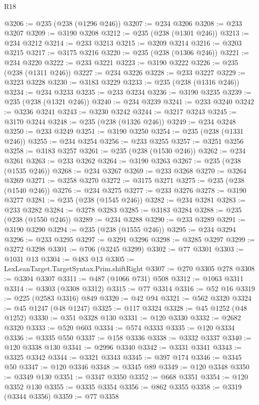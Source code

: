\begin{lexlean}{R18}
\begin{coremodule}
@3206 := @235 (@238 (@1296 @246))
@3207 := @234 @3206
@3208 := @233 @3207
@3209 := @3190 @3208
@3212 := @235 (@238 (@1301 @246))
@3213 := @234 @3212
@3214 := @233 @3213
@3215 := @3209 @3214
@3216 := @3203 @3215
@3217 := @3175 @3216
@3220 := @235 (@238 (@1306 @246))
@3221 := @234 @3220
@3222 := @233 @3221
@3223 := @3190 @3222
@3226 := @235 (@238 (@1311 @246))
@3227 := @234 @3226
@3228 := @233 @3227
@3229 := @3223 @3228
@3230 := @3183 @3229
@3233 := @235 (@238 (@1316 @246))
@3234 := @234 @3233
@3235 := @233 @3234
@3236 := @3190 @3235
@3239 := @235 (@238 (@1321 @246))
@3240 := @234 @3239
@3241 := @233 @3240
@3242 := @3236 @3241
@3243 := @3230 @3242
@3244 := @3217 @3243
@3245 := @3170 @3244
@3248 := @235 (@238 (@1326 @246))
@3249 := @234 @3248
@3250 := @233 @3249
@3251 := @3190 @3250
@3254 := @235 (@238 (@1331 @246))
@3255 := @234 @3254
@3256 := @233 @3255
@3257 := @3251 @3256
@3258 := @3183 @3257
@3261 := @235 (@238 (@1530 @246))
@3262 := @234 @3261
@3263 := @233 @3262
@3264 := @3190 @3263
@3267 := @235 (@238 (@1535 @246))
@3268 := @234 @3267
@3269 := @233 @3268
@3270 := @3264 @3269
@3271 := @3258 @3270
@3272 := @3175 @3271
@3275 := @235 (@238 (@1540 @246))
@3276 := @234 @3275
@3277 := @233 @3276
@3278 := @3190 @3277
@3281 := @235 (@238 (@1545 @246))
@3282 := @234 @3281
@3283 := @233 @3282
@3284 := @3278 @3283
@3285 := @3183 @3284
@3288 := @235 (@238 (@1550 @246))
@3289 := @234 @3288
@3290 := @233 @3289
@3291 := @3190 @3290
@3294 := @235 (@238 (@1555 @246))
@3295 := @234 @3294
@3296 := @233 @3295
@3297 := @3291 @3296
@3298 := @3285 @3297
@3299 := @3272 @3298
@3301 := @706 (@3245 @3299)
@3302 := @77 @3301
@3303 := @1031 @13
@3304 := @483 @13
@3305 := LexLeanTarget.TargetSyntax.Prim.shiftRight
@3307 := @270 @3305 @278
@3308 := @3304 @3307
@3311 := @487 (@1066 @731) @508
@3312 := @1063 @3311
@3314 := @3303 (@3308 @3312)
@3315 := @77 @3314
@3316 := @52 @16
@3319 := @225 (@2583 @3316) @849
@3320 := @42 @94
@3321 := @562 @3320
@3324 := @45 @1247 (@48 @1247)
@3325 := @117 @3324
@3328 := @45 @1252 (@48 @1252)
@3330 := @351 @3328 @130
@3331 := @120 @3330
@3332 := @2682 @3320
@3333 := @520 @603
@3334 := @574 @3333
@3335 := @120 @3334
@3336 := @3335 @550
@3337 := @158 @3336
@3338 := @3332 @3337
@3340 := @120 @3338 @130
@3341 := @2996 @3340
@3342 := @3331 @3341
@3343 := @3325 @3342
@3344 := @3321 @3343
@3345 := @397 @174
@3346 := @3345 @50
@3347 := @120 @3346
@3348 := @3345 @89
@3349 := @120 @3348
@3350 := @3349 @130
@3351 := @3347 @3350
@3352 := @668 @3351
@3354 := @120 @3352 @130
@3355 := @3335 @3354
@3356 := @862 @3355
@3358 := @3319 (@3344 @3356)
@3359 := @77 @3358

\end{coremodule}
\end{lexlean}

